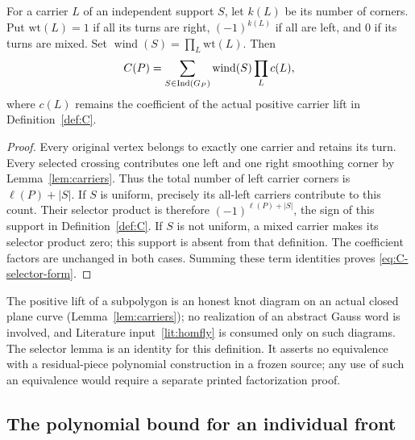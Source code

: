 \begin{lemma}\label{lem:C-X1}
For a carrier $L$ of an independent support $S$, let $k(L)$ be its number
of corners. Put $\mathrm{wt}(L)=1$ if all its turns are right,
$(-1)^{k(L)}$ if all are left, and $0$ if its turns are mixed.
Set $\operatorname{wind}(S)=\prod_L\mathrm{wt}(L)$. Then
\begin{equation}\label{eq:C-selector-form}
C(P)=\sum_{S\in\operatorname{Ind}(G_P)}\operatorname{wind}(S)\prod_L c(L),
\end{equation}
where $c(L)$ remains the coefficient of the actual positive carrier lift
in Definition~\ref{def:C}.
\end{lemma}
\begin{proof}
Every original vertex belongs to exactly one carrier and retains its turn.
Every selected crossing contributes one left and one right smoothing
corner by Lemma~\ref{lem:carriers}. Thus the total number of left carrier
corners is $\ell(P)+|S|$. If $S$ is uniform, precisely its all-left
carriers contribute to this count. Their selector product is therefore
$(-1)^{\ell(P)+|S|}$, the sign of this support in Definition~\ref{def:C}.
If $S$ is not uniform, a mixed carrier makes its selector product zero;
this support is absent from that definition. The coefficient factors
are unchanged in both cases. Summing these term identities proves
\eqref{eq:C-selector-form}.
\end{proof}

\begin{remark}
The positive lift of a subpolygon is an honest knot diagram on an actual
closed plane curve (Lemma~\ref{lem:carriers}); no realization of an abstract
Gauss word is involved, and Literature input~\ref{lit:homfly} is consumed
only on such diagrams. The selector lemma is an identity for this
definition. It asserts no equivalence with a residual-piece polynomial
construction in a frozen source; any use of such an equivalence would
require a separate printed factorization proof.
\end{remark}

\subsection{The polynomial bound for an individual front}
\label{ng:front-section}

